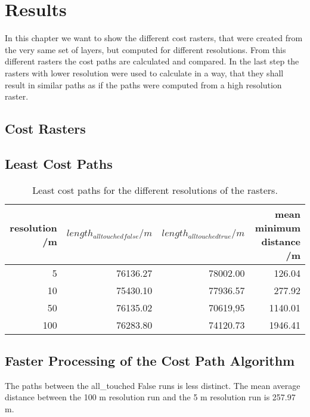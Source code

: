 \documentclass[acmtog]{acmart}
\begin{document}
	\section{Results}
	In this chapter we want to show the different cost rasters, that were created from the very same set of layers, but computed for different resolutions. From this different rasters the cost paths are calculated and compared. In the last step the rasters with lower resolution were used to calculate in a way, that they shall result in similar paths as if the paths were computed from a high resolution raster.
	\subsection{Cost Rasters}
	\subsection{Least Cost Paths}
	
	\begin{table}[h!]
	\caption{Least cost paths for the different resolutions of the rasters.}
	\label{table:2}
	\centering
	\begin{tabular}{ r  r  r r }
		resolution /m & $length_{all touched false} /m$ & $length_{all touched true} /m$ & mean minimum distance /m\\
		\hline
		5 & 76136.27					& 78002.00 & 126.04 \\
		10 & 75430.10 	& 77936.57 & 277.92 \\
		50 & 76135.02	& 70619,95 & 1140.01 \\
		100 & 76283.80	& 74120.73				& 1946.41 \\
	\end{tabular}
	\end{table}
	\subsection{Faster Processing of the Cost Path Algorithm}
	
	The paths between the all\_touched False runs is less distinct. The mean average distance between the 100 m resolution run and the 5 m resolution run is 257.97 m. 
	
\end{document}
